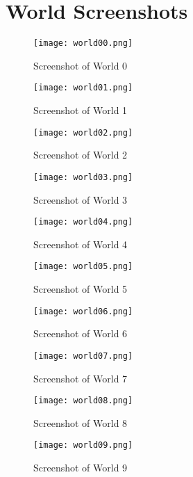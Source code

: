 \chapter{World Screenshots}
\label{sec:world_images}
\begin{figure}[H]
	\centering
	\texttt{[image: world00.png]}
	\caption{Screenshot of World 0}
	\label{fig:world0}
\end{figure}

\begin{figure}[H]
	\centering
	\texttt{[image: world01.png]}
	\caption{Screenshot of World 1}
	\label{fig:world1}
\end{figure}

\begin{figure}[H]
	\centering
	\texttt{[image: world02.png]}
	\caption{Screenshot of World 2}
	\label{fig:world2}
\end{figure}

\begin{figure}[H]
	\centering
	\texttt{[image: world03.png]}
	\caption{Screenshot of World 3}
	\label{fig:world3}
\end{figure}

\begin{figure}[H]
	\centering
	\texttt{[image: world04.png]}
	\caption{Screenshot of World 4}
	\label{fig:world4}
\end{figure}

\begin{figure}[H]
	\centering
	\texttt{[image: world05.png]}
	\caption{Screenshot of World 5}
	\label{fig:world5}
\end{figure}

\begin{figure}[H]
	\centering
	\texttt{[image: world06.png]}
	\caption{Screenshot of World 6}
	\label{fig:world6}
\end{figure}

\begin{figure}[H]
	\centering
	\texttt{[image: world07.png]}
	\caption{Screenshot of World 7}
	\label{fig:world7}
\end{figure}

\begin{figure}[H]
	\centering
	\texttt{[image: world08.png]}
	\caption{Screenshot of World 8}
	\label{fig:world8}
\end{figure}

\begin{figure}[H]
	\centering
	\texttt{[image: world09.png]}
	\caption{Screenshot of World 9}
	\label{fig:world9}
\end{figure}
